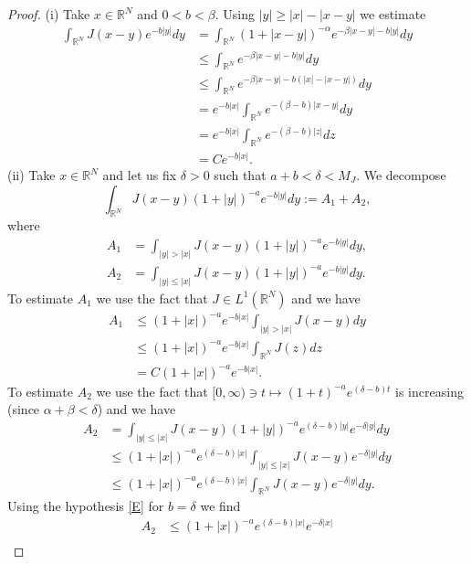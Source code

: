 \documentclass[leqno,12pt]{article}
\newcommand{\R}{\mathbb R}
\numberwithin{equation}{section}
\begin{document}
\begin{proof}
(i) Take $x\in \R^N$ and $0<b<\beta$. Using $|y|\geq |x|-|x-y|$ we estimate
$$
\begin{aligned}
\int_{\R^N}J(x-y)e^{-b|y|}dy&= \int_{\R^N}(1+|x-y|)^{-\alpha}e^{-\beta|x-y|-b|y|}dy\\
&\leq  \int_{\R^N} e^{-\beta|x-y|-b|y|}dy\\
&\leq \int_{\R^N}e^{-\beta|x-y|-b(|x|-|x-y|)}dy\\
&= e^{-b|x|} \int_{\R^N}e^{-(\beta-b)|x-y|}dy\\
&= e^{-b|x|} \int_{\R^N}e^{-(\beta-b)|z|} dz\\
&= C e^{-b|x|}. 
\end{aligned}
$$
(ii) Take $x\in \R^N$ and let us fix $\delta>0$ such that $a+b<\delta< M_J$. We decompose
\begin{equation}\label{kernj1}
\int_{\R^N} J(x-y) (1+|y|)^{-a}e^{-b|y|} dy:=A_1+A_2,
\end{equation}
where
$$
\begin{aligned}
A_1&=\int_{|y|>|x|} J(x-y) (1+|y|)^{-a}e^{-b |y|} dy,\\[0.1in]
A_2&=\int_{|y|\leq |x|} J(x-y) (1+|y|)^{-a}e^{-b |y|} dy.
\end{aligned}
$$
To estimate $A_1$ we use the fact that $J\in L^1(\R^N)$ and we have 
\begin{equation}\label{kernj2}
\begin{aligned}
A_1&\leq (1+|x|)^{-a}e^{-b |x|}  \int_{|y|>|x|} J(x-y) dy\\
&\leq (1+|x|)^{-a}e^{-b |x|}  \int_{\R^N} J(z) dz\\
&=C (1+|x|)^{-a}e^{-b |x|}.
\end{aligned}
\end{equation}
To estimate $A_2$ we use the fact that $[0, \infty)\ni t\longmapsto (1+t)^{-a}e^{(\delta-b)t}$ is increasing (since $\alpha+\beta<\delta$) and we have 
$$
\begin{aligned}
A_2& = \int_{|y|\leq |x|} J(x-y) (1+|y|)^{-a}e^{(\delta-b)|y|} e^{-\delta |y|} dy\\
&\leq (1+|x|)^{-a}e^{(\delta-b)|x|}  \int_{|y|\leq |x|} J(x-y) e^{-\delta |y|} dy\\
&\leq (1+|x|)^{-a}e^{(\delta-b)|x|}  \int_{\R^N} J(x-y) e^{-\delta |y|} dy.
\end{aligned}
$$
Using the hypothesis \eqref{E} for $b=\delta$ we find
\begin{equation}\label{kernj3}
\begin{aligned}
A_2&  \leq (1+|x|)^{-a}e^{(\delta-b)|x|} e^{-\delta |x|} \\

\end{aligned}
\end{equation}
\end{proof}
\end{document}
